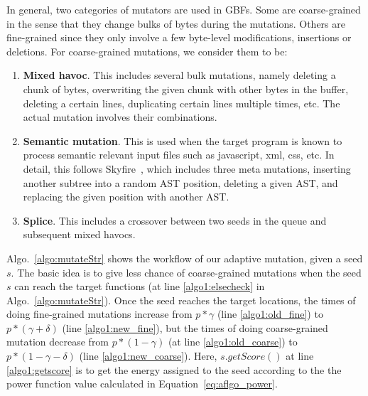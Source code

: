 In general, two categories of mutators are used in GBFs. Some are coarse-grained in the sense that they change bulks of bytes during the mutations. Others are fine-grained since they only involve a few byte-level modifications, insertions or deletions. For coarse-grained mutations, we consider them to be:
\begin{enumerate}[(1)] 
	\item \textbf{Mixed havoc}. This includes several bulk mutations, namely deleting a chunk of bytes, overwriting the given chunk with other bytes in the buffer, deleting a certain lines, duplicating certain lines multiple times, etc. The actual mutation involves their combinations.
	\item \textbf{Semantic mutation}. This is used when the target program is known to process semantic relevant input files such as javascript, xml, css, etc. In detail, this follows Skyfire~\cite{junjie:2017sp:skyfire}, which includes three meta mutations, inserting another subtree into a random AST position, deleting a given AST, and replacing the given position with another AST.
	\item \textbf{Splice}. This includes a crossover between two seeds in the queue and subsequent mixed havocs.
\end{enumerate}


Algo.~\ref{algo:mutateStr} shows the workflow of our adaptive mutation, given a seed $s$. 
The basic idea is to give less chance of coarse-grained mutations when the seed $s$ can reach the target functions (at line \ref{algo1:elsecheck} in Algo.~\ref{algo:mutateStr}). Once the seed reaches the target locations, the times of doing fine-grained mutations increase from  $ p * 	\gamma$ (line \ref{algo1:old_fine}) to $p *(	\gamma + \delta)$ (line \ref{algo1:new_fine}), but the times of doing coarse-grained mutation decrease from  $ p *(1- 	\gamma )$ (at line \ref{algo1:old_coarse}) to $p *(1- 	\gamma -\delta )$ (line \ref{algo1:new_coarse}). Here, $s.getScore()$ at line \ref{algo1:getscore} is to get the energy assigned to the seed according to the the power function value calculated in Equation~\ref{eq:aflgo_power}.

